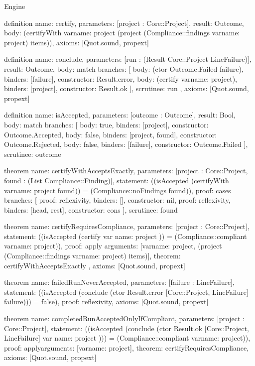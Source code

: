 \begin{lexlean}{Engine}
\begin{semanticmodule}
definition{
  name: certify,
  parameters: [project : Core::Project],
  result: Outcome,
  body: (certifyWith var{name: project} (project (Compliance::findings var{name: project}) items)),
  axioms: [Quot.sound, propext]
}

definition{
  name: conclude,
  parameters: [run : (Result Core::Project LineFailure)],
  result: Outcome,
  body: match{
    branches: [
      {body: (ctor Outcome.Failed failure), binders: [failure], constructor: Result.error},
      {body: (certify var{name: project}), binders: [project], constructor: Result.ok}
    ],
    scrutinee: run
  },
  axioms: [Quot.sound, propext]
}

definition{
  name: isAccepted,
  parameters: [outcome : Outcome],
  result: Bool,
  body: match{
    branches: [
      {body: true, binders: [project], constructor: Outcome.Accepted},
      {body: false, binders: [project, found], constructor: Outcome.Rejected},
      {body: false, binders: [failure], constructor: Outcome.Failed}
    ],
    scrutinee: outcome
  }
}

theorem{
  name: certifyWithAcceptsExactly,
  parameters: [project : Core::Project, found : (List Compliance::Finding)],
  statement: ((isAccepted (certifyWith var{name: project} found)) = (Compliance::noFindings found)),
  proof: cases{
    branches: [
      {proof: reflexivity{}, binders: [], constructor: nil},
      {proof: reflexivity{}, binders: [head, rest], constructor: cons}
    ],
    scrutinee: found
  }
}

theorem{
  name: certifyRequiresCompliance,
  parameters: [project : Core::Project],
  statement: ((isAccepted (certify var{
    name: project
  })) = (Compliance::compliant var{name: project})),
  proof: apply{
    arguments: [var{name: project}, (project (Compliance::findings var{name: project}) items)],
    theorem: certifyWithAcceptsExactly
  },
  axioms: [Quot.sound, propext]
}

theorem{
  name: failedRunNeverAccepted,
  parameters: [failure : LineFailure],
  statement: ((isAccepted (conclude (ctor Result.error [Core::Project, LineFailure] failure))) = false),
  proof: reflexivity{},
  axioms: [Quot.sound, propext]
}

theorem{
  name: completedRunAcceptedOnlyIfCompliant,
  parameters: [project : Core::Project],
  statement: ((isAccepted (conclude (ctor Result.ok [Core::Project, LineFailure] var{
    name: project
  }))) = (Compliance::compliant var{name: project})),
  proof: apply{arguments: [var{name: project}], theorem: certifyRequiresCompliance},
  axioms: [Quot.sound, propext]
}


\end{semanticmodule}
\end{lexlean}
